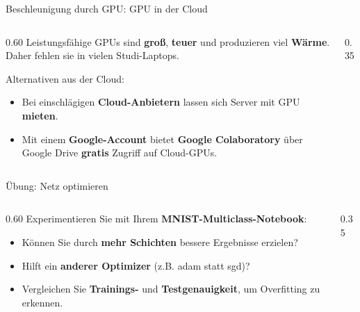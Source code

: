 \begin{frame}{Beschleunigung durch GPU: GPU in der Cloud}
\begin{columns}
\begin{column}{0.60\textwidth}
Leistungsfähige GPUs sind \textbf{groß}, \textbf{teuer} und produzieren viel \textbf{Wärme}. Daher fehlen sie in vielen Studi-Laptops.

\vspace{0.5em}
Alternativen aus der Cloud:
\begin{itemize}
\item Bei einschlägigen \textbf{Cloud-Anbietern} lassen sich Server mit GPU \textbf{mieten}.
\item Mit einem \textbf{Google-Account} bietet \textbf{Google Colaboratory} über Google Drive \textbf{gratis} Zugriff auf Cloud-GPUs.
\end{itemize}
\end{column}
\begin{column}{0.35\textwidth}
\centering
{}
\end{column}
\end{columns}
\end{frame}

\makequizpage{\QUIZURL}{\QUIZQRCODE}{\QUIZIMAGE}

\begin{frame}{Übung: Netz optimieren}
\begin{columns}
\begin{column}{0.60\textwidth}
Experimentieren Sie mit Ihrem \textbf{MNIST-Multiclass-Notebook}:
\begin{itemize}
\item Können Sie durch \textbf{mehr Schichten} bessere Ergebnisse erzielen?
\item Hilft ein \textbf{anderer Optimizer} (z.B. adam statt sgd)?
\item Vergleichen Sie \textbf{Trainings-} und \textbf{Testgenauigkeit}, um Overfitting zu erkennen.
\end{itemize}
\end{column}
\begin{column}{0.35\textwidth}
\centering
{}
\end{column}
\end{columns}
\end{frame}


